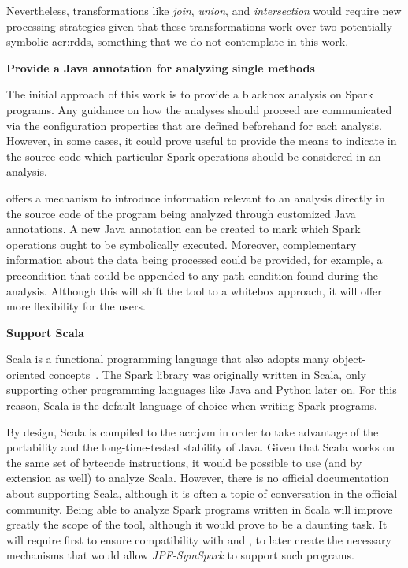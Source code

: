 Nevertheless, transformations like \textit{join}, \textit{union}, and \textit{intersection} would require new processing strategies given that these transformations work over two potentially symbolic \acrshort{acr:rdd}s, something that we do not contemplate in this work.

\textbf{Provide a Java annotation for analyzing single methods}

The initial approach of this work is to provide a blackbox analysis on Spark programs. Any guidance on how the analyses should proceed are communicated via the configuration properties that are defined beforehand for each analysis. However, in some cases, it could prove useful to provide the means to indicate in the source code which particular Spark operations should be considered in an analysis.

\jpf{} offers a mechanism to introduce information relevant to an analysis directly in the source code of the program being analyzed through customized Java annotations. A new Java annotation can be created to mark which Spark operations ought to be symbolically executed. Moreover, complementary information about the data being processed could be provided, for example, a precondition that could be appended to any path condition found during the analysis. Although this will shift the tool to a whitebox approach, it will offer more flexibility for the users. 

\textbf{Support Scala}

Scala is a functional programming language that also adopts many object-oriented concepts~\cite{WebScala2017}. The Spark library was originally written in Scala, only supporting other programming languages like Java and Python later on. For this reason, Scala is the default language of choice when writing Spark programs. 

By design, Scala is compiled to the \acrlong{acr:jvm} in order to take advantage of the portability and the long-time-tested stability of Java. Given that Scala works on the same set of bytecode instructions, it would be possible to use \jpf{} (and by extension \spf{} as well) to analyze Scala. However, there is no official documentation about \jpf{} supporting Scala, although it is often a topic of conversation in the official \jpf{} community. Being able to analyze Spark programs written in Scala will improve greatly the scope of the tool, although it would prove to be a daunting task. It will require first to ensure compatibility with \jpf{} and \spf{}, to later create the necessary mechanisms that would allow \textit{JPF-SymSpark} to support such programs.
